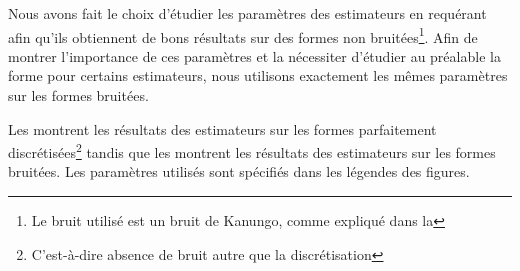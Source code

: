 Nous avons fait le choix d'étudier les paramètres des estimateurs en requérant
afin qu'ils obtiennent de bons résultats sur des formes non bruitées\footnote{Le
bruit utilisé est un bruit de Kanungo, comme expliqué dans la }. Afin de montrer l'importance de ces paramètres et la
nécessiter d'étudier au préalable la forme pour certains estimateurs, nous
utilisons exactement les mêmes paramètres sur les formes bruitées.

Les  montrent les résultats des estimateurs sur les formes parfaitement discrétisées\footnote{C'est-à-dire absence de bruit autre que la discrétisation} tandis que les  montrent les résultats des estimateurs sur les formes bruitées. Les paramètres utilisés sont spécifiés dans les légendes des figures.

